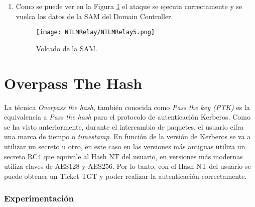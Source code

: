 \begin{enumerate}
\item Como se puede ver en la Figura \ref{NTLMRelay5} el ataque se ejecuta correctamente y se vuelca los datos de la SAM del Domain Controller. 
\begin{figure}[H] %
\begin{center}
\texttt{[image: NTLMRelay/NTLMRelay5.png]}
\end{center}
\caption{Volcado de la SAM.}
\label{NTLMRelay5}
\end{figure}

\end{enumerate}

\section{Overpass The Hash}

La técnica {\it Overpass the hash}, también conocida como {\it Pass the key (PTK)} es la equivalencia a {\it Pass the hash} para el protocolo de autenticación Kerberos. Como se ha visto anteriormente, durante el intercambio de paquetes, el usuario cifra una marca de tiempo o {\it timestamp}. En función de la versión de Kerberos se va a utilizar un secreto u otro, en este caso en las versiones más antiguas utiliza un secreto RC4 que equivale al Hash NT del usuario, en versiones más modernas utiliza claves de AES128 y AES256. Por lo tanto, con el Hash NT del usuario se puede obtener un Ticket TGT y poder realizar la autenticación correctamente.

\subsubsection{Experimentación}

